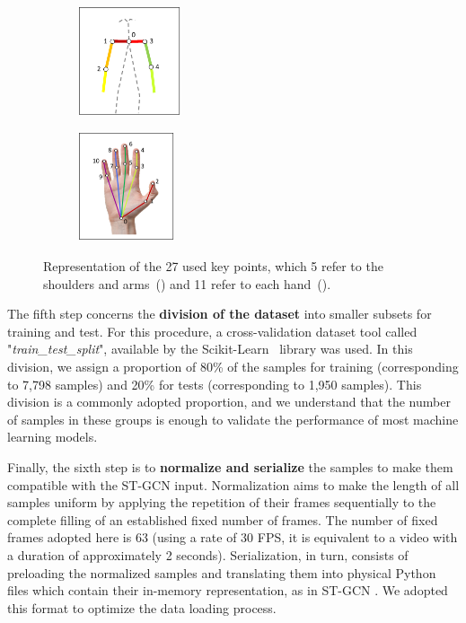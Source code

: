 \begin{figure}
    \centering
    \begin{subfigure}{3.0cm}
        \centering
        \includegraphics[height=3.2cm]{images/filtered_keypoints_body}
        \caption{}
        \label{fig:filtered-keypoints-body}
    \end{subfigure}
    \begin{subfigure}{3.0cm}
      \centering
      \includegraphics[height=3.2cm]{images/filtered_keypoints_hand}
      \caption{}
      \label{fig:filtered-keypoints-hand}
    \end{subfigure}
    \caption{
        Representation of the 27 used key points, which 5 refer to the shoulders and arms~() and 11 refer to each hand~().
    }
    \label{fig:filtered-keypoints}
\end{figure}

The fifth step concerns the \textbf{division of the dataset} into smaller subsets for training and test. For this procedure, a cross-validation dataset tool called "\textit{train\_test\_split}", available by the Scikit-Learn~\cite{scikit-learn} library was used. In this division, we assign a proportion of 80\% of the samples for training (corresponding to 7,798 samples) and 20\% for tests (corresponding to 1,950 samples). This division is a commonly adopted proportion, and we understand that the number of samples in these groups is enough to validate the performance of most machine learning models.

Finally, the sixth step is to \textbf{normalize and serialize} the samples to make them compatible with the ST-GCN input. Normalization aims to make the length of all samples uniform by applying the repetition of their frames sequentially to the complete filling of an established fixed number of frames. The number of fixed frames adopted here is 63 (using a rate of 30 FPS, it is equivalent to a video with a duration of approximately 2 seconds). Serialization, in turn, consists of preloading the normalized samples and translating them into physical Python files which contain their in-memory representation, as in ST-GCN \cite{st-gcn-2018}. We adopted this format to optimize the data loading process. 

